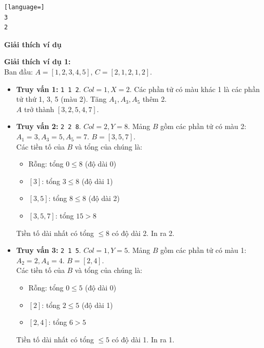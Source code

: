 \documentclass[12pt,a4paper]{article}
\newcommand{\explanation}{%
  \vspace{6pt}\textbf{\textcolor{sectioncolor}{Giải thích ví dụ}}\par\vspace{2pt}%
}
\begin{document}
\begin{lstlisting}[language=]
3
2
\end{lstlisting}

\explanation
\textbf{Giải thích ví dụ 1:} \\
Ban đầu: $A = [1, 2, 3, 4, 5]$, $C = [2, 1, 2, 1, 2]$.
\begin{itemize}
    \item \textbf{Truy vấn 1:} \texttt{1 1 2}. $Col = 1, X = 2$. Các phần tử có màu khác 1 là các phần tử thứ 1, 3, 5 (màu 2). Tăng $A_1, A_3, A_5$ thêm 2. \\
    $A$ trở thành $[3, 2, 5, 4, 7]$.
    \item \textbf{Truy vấn 2:} \texttt{2 2 8}. $Col = 2, Y = 8$. Mảng $B$ gồm các phần tử có màu 2: $A_1=3, A_3=5, A_5=7$. $B = [3, 5, 7]$. \\
    Các tiền tố của $B$ và tổng của chúng là:
    \begin{itemize}
        \item Rỗng: tổng $0 \le 8$ (độ dài 0)
        \item $[3]$: tổng $3 \le 8$ (độ dài 1)
        \item $[3, 5]$: tổng $8 \le 8$ (độ dài 2)
        \item $[3, 5, 7]$: tổng $15 > 8$
    \end{itemize}
    Tiền tố dài nhất có tổng $\le 8$ có độ dài 2. In ra 2.
    \item \textbf{Truy vấn 3:} \texttt{2 1 5}. $Col = 1, Y = 5$. Mảng $B$ gồm các phần tử có màu 1: $A_2=2, A_4=4$. $B = [2, 4]$. \\
    Các tiền tố của $B$ và tổng của chúng là:
    \begin{itemize}
        \item Rỗng: tổng $0 \le 5$ (độ dài 0)
        \item $[2]$: tổng $2 \le 5$ (độ dài 1)
        \item $[2, 4]$: tổng $6 > 5$
    \end{itemize}
    Tiền tố dài nhất có tổng $\le 5$ có độ dài 1. In ra 1.
\end{itemize}


\newpage




\end{document}
